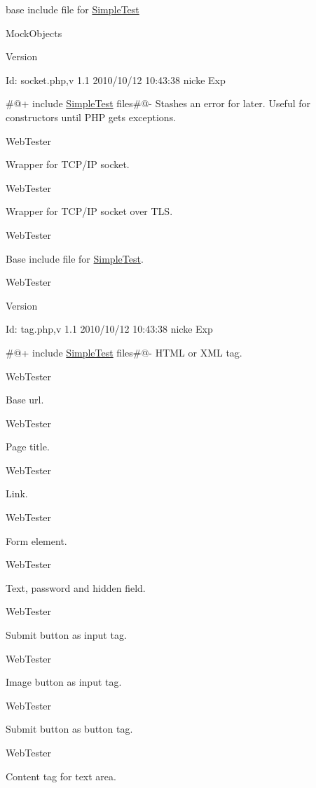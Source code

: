 base include file for \hyperlink{class_simple_test}{SimpleTest}

MockObjects \begin{DoxyVersion}{Version}

\end{DoxyVersion}
\begin{DoxyParagraph}{Id:}
socket.php,v 1.1 2010/10/12 10:43:38 nicke Exp 
\end{DoxyParagraph}


\#@+ include \hyperlink{class_simple_test}{SimpleTest} files\#@-\/ Stashes an error for later. Useful for constructors until PHP gets exceptions.

WebTester

Wrapper for TCP/IP socket.

WebTester

Wrapper for TCP/IP socket over TLS.

WebTester

Base include file for \hyperlink{class_simple_test}{SimpleTest}.

WebTester \begin{DoxyVersion}{Version}

\end{DoxyVersion}
\begin{DoxyParagraph}{Id:}
tag.php,v 1.1 2010/10/12 10:43:38 nicke Exp 
\end{DoxyParagraph}


\#@+ include \hyperlink{class_simple_test}{SimpleTest} files\#@-\/ HTML or XML tag.

WebTester

Base url.

WebTester

Page title.

WebTester

Link.

WebTester

Form element.

WebTester

Text, password and hidden field.

WebTester

Submit button as input tag.

WebTester

Image button as input tag.

WebTester

Submit button as button tag.

WebTester

Content tag for text area.

